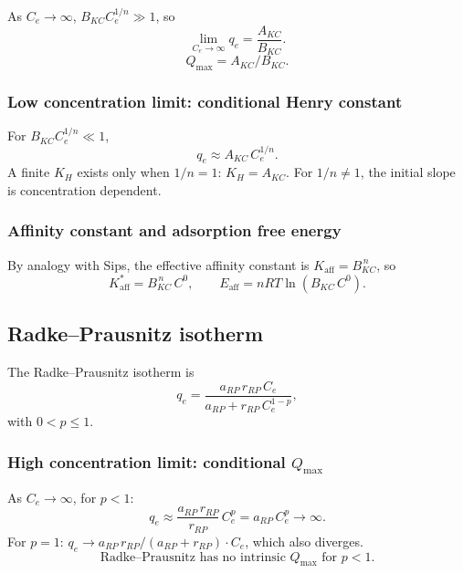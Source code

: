 \documentclass[journal=jacsat,manuscript=article]{achemso}
\begin{document}
As $C_e \to \infty$, $B_{KC}C_e^{1/n} \gg 1$, so
\begin{equation}
	\lim_{C_e \to \infty} q_e = \frac{A_{KC}}{B_{KC}}.
\end{equation}
\begin{equation}
	\boxed{Q_{\max} = A_{KC}/B_{KC}.}
\end{equation}

\subsubsection{Low concentration limit: conditional Henry constant}

For $B_{KC}C_e^{1/n} \ll 1$,
\begin{equation}
	q_e \approx A_{KC}\, C_e^{1/n}.
\end{equation}
A finite $K_H$ exists only when $1/n = 1$: $K_H = A_{KC}$.
For $1/n \neq 1$, the initial slope is concentration dependent.

\subsubsection{Affinity constant and adsorption free energy}

By analogy with Sips, the effective affinity constant is
$K_{\mathrm{aff}} = B_{KC}^{\,n}$, so
\begin{equation}
	\boxed{
		K_{\mathrm{aff}}^{\ast} = B_{KC}^{\,n}\, C^0,
		\qquad
		E_{\mathrm{aff}} = nRT\ln(B_{KC}\, C^0).
	}
\end{equation}

\subsection{Radke--Prausnitz isotherm}
\label{sec:si_radke_prausnitz}

The Radke--Prausnitz isotherm is
\begin{equation}
	q_e = \frac{a_{RP}\, r_{RP}\, C_e}{a_{RP} + r_{RP}\, C_e^{1-p}},
	\label{eq:si_radke_prausnitz}
\end{equation}
with $0 < p \leq 1$.

\subsubsection{High concentration limit: conditional $Q_{\max}$}

As $C_e \to \infty$, for $p < 1$:
\begin{equation}
	q_e \approx \frac{a_{RP}\, r_{RP}}{r_{RP}}\, C_e^{p} = a_{RP}\, C_e^{p} \to \infty.
\end{equation}
For $p = 1$: $q_e \to a_{RP}\, r_{RP}/(a_{RP} + r_{RP}) \cdot C_e$, which also diverges.
\begin{equation}
	\boxed{\text{Radke--Prausnitz has no intrinsic } Q_{\max} \text{ for } p < 1.}
\end{equation}
\end{document}
